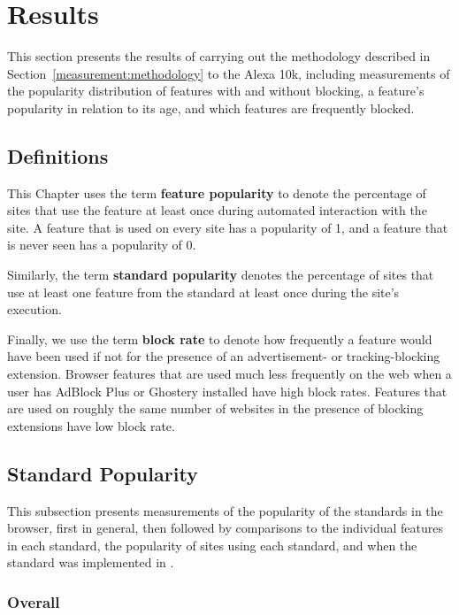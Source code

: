 \section{Results}
\label{measurement:results}

This section presents the results of carrying out the methodology described in
Section~\ref{measurement:methodology} to the Alexa 10k, including measurements
of the popularity distribution of \JS features with and without blocking, a
feature's popularity in relation to its age, and which features are frequently
blocked.


\subsection{Definitions}
This Chapter uses the term \textbf{feature popularity} to
denote the percentage of sites that use the feature at least once during
automated interaction with the site.  A feature that is used on every site has
a popularity of 1, and a feature that is never seen has a popularity of 0.

Similarly, the term \textbf{standard popularity} denotes the
percentage of sites that use at least one feature from the standard at least
once during the site's execution.

Finally, we use the term \textbf{block rate} to denote how frequently a feature
would have been used if not for the presence of an advertisement- or
tracking-blocking extension. Browser features that are used much less
frequently on the web when a user has AdBlock Plus or Ghostery installed have
high block rates. Features that are used on roughly the same number of
websites in the presence of blocking extensions have low block rate.


\subsection{Standard Popularity}
This subsection presents measurements of the popularity of the standards in the
browser, first in general, then followed by comparisons to the individual
features in each standard, the popularity of sites using each standard, and
when the standard was implemented in \FF.


\subsubsection{Overall}




